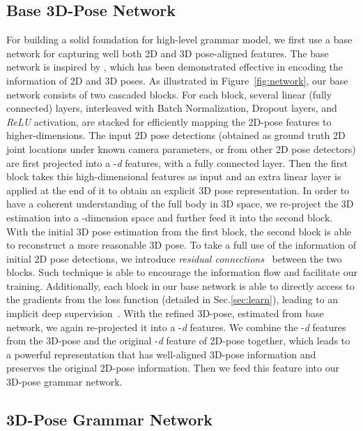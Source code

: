 \documentclass[letterpaper]{article} \usepackage{aaai18}  \usepackage{times}  \usepackage{helvet}  \usepackage{courier}  \usepackage{url}  \usepackage{color}
\begin{document}
\subsection{Base 3D-Pose Network}

For building a solid foundation for high-level grammar model, we first use a base network for capturing well both 2D and 3D pose-aligned features. The base network is inspired by \cite{martinez2017simple}, which has been demonstrated effective in encoding the information of 2D and 3D poses. As illustrated in Figure~\ref{fig:network}, our base network consists of two cascaded blocks. For each block, several linear (fully connected) layers, interleaved with Batch Normalization, Dropout layers, and \textit{ReLU} activation, are stacked for efficiently mapping the 2D-pose features to higher-dimensions.
The input 2D pose detections  (obtained as ground truth 2D joint locations under known camera parameters, or from other 2D pose detectors) are first projected into a -\textit{d} features, with a fully connected layer. Then the first block takes this high-dimensional features as input and an extra linear layer is applied at the end of it to obtain an explicit 3D pose representation. In order to have a coherent understanding of the full body in 3D space, we re-project the 3D estimation into a -dimension space and further feed it into the second block. With the initial 3D pose estimation from the first block, the second block is able to reconstruct a more reasonable 3D pose.
To take a full use of the information of initial 2D pose detections, we introduce \textit{residual connections}~\cite{he2016deep} between the two blocks. Such technique is able to encourage the information flow and facilitate our training. Additionally, each block in our base network is able to directly access to the gradients from the loss function (detailed in Sec.\ref{sec:learn}), leading to an implicit deep supervision~\cite{lee2015deeply}.
With the refined 3D-pose, estimated from base network, we again re-projected it into a -\textit{d} features. We combine the -\textit{d} features from the 3D-pose and the original -\textit{d} feature of 2D-pose together, which leads to a powerful representation that has well-aligned 3D-pose information and preserves the original 2D-pose information. Then we feed this feature into our 3D-pose grammar network.

\subsection{3D-Pose Grammar Network}
\end{document}
